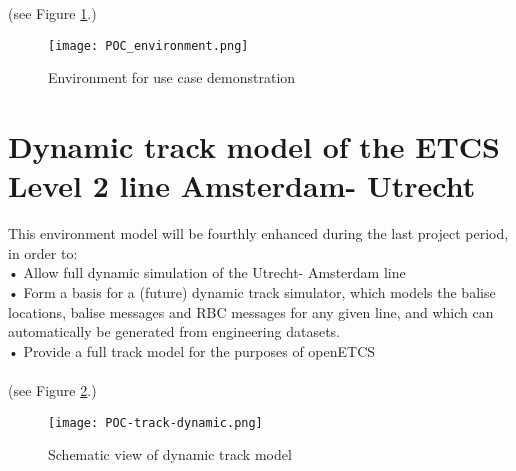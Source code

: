 (see Figure \ref{fig:WP3-demo}.)
	
\begin{figure}
  \centering
  \texttt{[image: POC\_environment.png]}
  \caption{Environment for use case demonstration}
  \label{fig:WP3-demo}
\end{figure}




\section{Dynamic track model of the ETCS Level 2 line Amsterdam- Utrecht}

This environment model will be fourthly enhanced during the last project period, in order to:\\

•   Allow full dynamic simulation of the Utrecht- Amsterdam line\\
•   Form a basis for a (future) dynamic track simulator, which models the balise locations, balise messages and RBC messages for any given line, and which can automatically be generated from engineering datasets.\\
•   Provide a full track model for the purposes of openETCS\\
\\

(see Figure \ref{fig:track-dynamic}.)
	
\begin{figure}
  \centering
  \texttt{[image: POC-track-dynamic.png]}
  \caption{Schematic view of dynamic track model}
  \label{fig:track-dynamic}
\end{figure}

%
%
%
%



